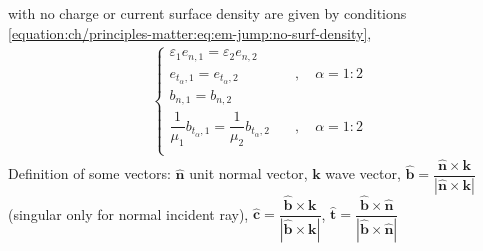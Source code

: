 \documentclass[letterpaper,10pt,english]{jupyterBook}
\begin{document}
\sphinxAtStartPar
{\hyperref[\detokenize{ch/principles-matter:classical-electromagnetism-media-jump}]{}} with no charge or current surface density are given by conditions \eqref{equation:ch/principles-matter:eq:em-jump:no-surf-density},
\begin{equation*}
\begin{split}\begin{cases}
  \varepsilon_1 e_{n,1} = \varepsilon_2 e_{n,2} \\
  e_{t_{\alpha},1} = e_{t_{\alpha},2}                                    & \quad , \quad \alpha=1:2 \\
  b_{n,1} = b_{n,2}  \\
  \dfrac{1}{\mu_1} b_{t_{\alpha},1} = \dfrac{1}{\mu_2} b_{t_{\alpha},2}  & \quad , \quad \alpha=1:2 \\
\end{cases}\end{split}
\end{equation*}
\sphinxAtStartPar
Definition of some vectors: \(\hat{\mathbf{n}}\) unit normal vector, \(\mathbf{k}\) wave vector, \(\hat{\mathbf{b}} = \dfrac{\hat{\mathbf{n}} \times \mathbf{k}}{|\hat{\mathbf{n}} \times \mathbf{k}|}\) (singular only for normal incident ray), \(\hat{\mathbf{c}} = \dfrac{\hat{\mathbf{b}} \times \mathbf{k}}{|\hat{\mathbf{b}} \times \mathbf{k}|}\), \(\hat{\mathbf{t}} = \dfrac{\hat{\mathbf{b}} \times \hat{\mathbf{n}}}{|\hat{\mathbf{b}} \times \hat{\mathbf{n}}|}\)
\end{document}
